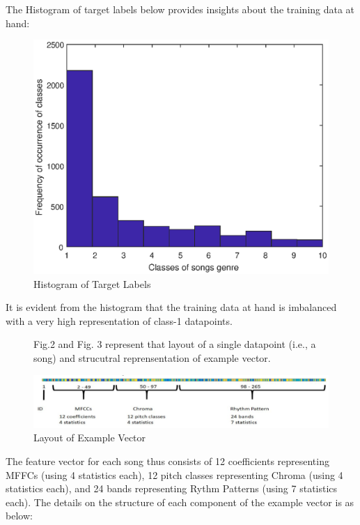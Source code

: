 \documentclass[journal]{IEEEtran}
\begin{document}
The Histogram of target labels below provides insights about the training data at hand: \par

\begin{figure}[ht!]
\begin{center}
	\includegraphics[width=\columnwidth]{images/hist.eps}
	\caption{Histogram of Target Labels}
	\label{fig: Fig.1}
\end{center}
\end{figure}
It is evident from the histogram that the training data at hand is imbalanced with a very high representation of class-1 datapoints.

\begin{figure}[h!]
	Fig.2 and Fig. 3 represent that layout of a single datapoint (i.e., a song) and strucutral reprensentation of example vector. \par
	\begin{center}
		\includegraphics[width=\columnwidth]{images/1_ExampleVectorStructure.PNG}
		\caption{Layout of Example Vector}
		\label{fig: Fig.2}
	\end{center}
\end{figure}
The feature vector for each song thus consists of 12 coefficients representing MFFCs (using 4 statistics each), 12 pitch classes representing Chroma (using 4 statistics each), and 24 bands representing Rythm Patterns (using 7 statistics each). The details on the structure of each component of the example vector is as below: \par
\end{document}
